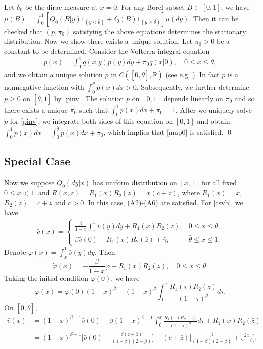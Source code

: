 \documentclass[graybox]{svmult}
\begin{document}
\proof
Let $\delta_0$ be the dirac measure at $x=0$. For any Borel subset $B\subset [0,1]$, we have  $\bar \mu(B) =\int_0^1 [Q_0(B|y)1_{(y<\bar \theta)} +\delta_0(B) 1_{(y\ge \bar \theta)}  ] \bar \mu(dy)$. Then it can be checked that $(p,\pi_0 )$ satisfying the above equations determines the stationary distribution.
Now we show there exists a unique solution.
Let $\pi_0>0$ be a constant to be determined.
Consider the Volterra integral equation
\begin{align}
p(x)=  \int_0^x q(x|y) p(y) dy +\pi_0q(x|0), \quad 0\le  x\le \bar \theta, \end{align}
and we obtain a unique solution $p$ in  $C([0, \bar \theta], \mathbb{R})$ (see e.g. \cite[p.33]{K89}). In fact $p$ is a nonnegative function with
$\int_0^{\bar \theta}p(x) dx>0$. Subsequently, we further determine $p\ge 0$ on $[\bar \theta, 1]$ by \eqref{pinv}. The solution $p$ on $[0,1]$ depends linearly on $\pi_0$ and so there exists a unique $\pi_0$ such that $\int_0^1 p(x)dx +\pi_0=1$.   After we uniquely solve $p$ for \eqref{pinv}, we integrate both sides of this equation on $[0, 1]$ and obtain $\int_0^1 p(x) dx =\int_0^{\bar\theta} p(x) dx+\pi_0$, which implies that \eqref{mup0} is satisfied.
 \qed

\subsection{Special Case}

Now we suppose $Q_0(dy|x)$ has uniform distribution on $[x, 1]$ for all fixed $0\le x<1$, and
 $R(x,z)=R_1(x)R_2(z)= x(c+z)$, where $R_1(x)=x$, $R_2(z)=c+z$ and $c>0$.
 In this case, (A2)-(A6) are satisfied.
For \eqref{csvb}, we have
\begin{align}\label{vzs}
 \bar v(x)=
 \begin{cases}
\displaystyle
\frac{\beta}{1-x}\int_x^1 \bar v(y) dy +R_1(x)R_2(\bar z), & 0\le x\le \bar \theta,\\
\displaystyle
 \beta \bar v(0)+R_1(x)R_2(\bar  z) +\bar \gamma,&  \bar \theta\le  x\le  1 .
\end{cases}
\end{align}
Denote $\varphi (x)= \int_x^1 \bar v(y) dy $. Then
$$
\dot \varphi(x)= -\frac{\beta}{1-x} \varphi -R_1(x) R_2(\bar z), \quad 0\le x\le
\bar \theta.
$$
Taking the initial condition $\varphi (0)$, we have
$$
\varphi(x) =\varphi (0)(1-x)^\beta -(1-x)^\beta \int_0^x \frac{R_1(\tau) R_2 (\bar z)}{(1-\tau)^\beta} d\tau.
$$
On $[0, \bar \theta]$,
\begin{align*}
\bar v(x)&= (1-x)^{\beta-1} \bar v(0) -\beta (1-x)^{\beta-1} \int_0^x \frac{R_1(\tau)R_2( \bar z)}
{(1-\tau)^\beta} d\tau +R_1(x)R_2(\bar z)\\
&= (1-x)^{\beta-1}\Big[\bar v(0)-\frac{\beta(c+\bar z)}{(1-\beta)(2-\beta)}\Big]
+(c+\bar z)\Big[\frac{\beta}{(1-\beta)(2-\beta)}+\frac{2x}{2-\beta}\Big].
\end{align*}
\end{document}
